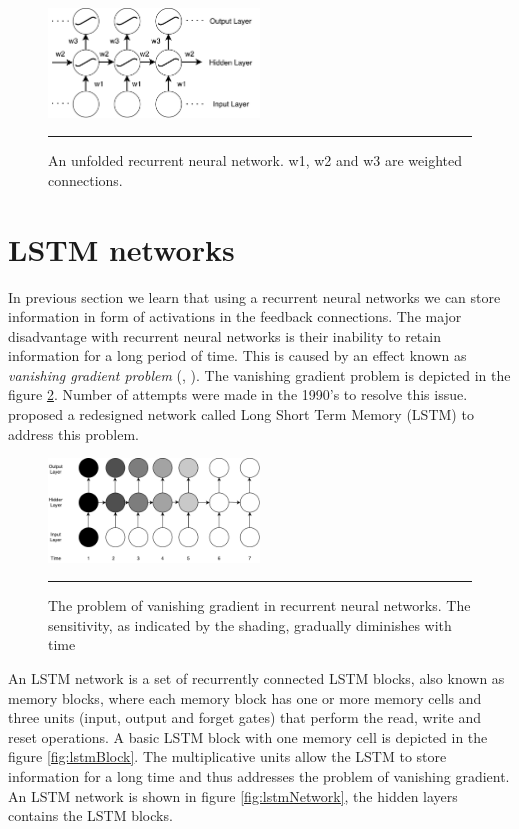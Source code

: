 \begin{figure}[htbp]
  \centering
    \includegraphics[width=0.5\textwidth,height=0.5\textheight,keepaspectratio]
    {Figures/unfolded-rnn.pdf}
    \rule{35em}{0.5pt}
  \caption[An unfolded RNN] {An unfolded recurrent neural network. w1, w2 and w3 are weighted
  connections. }
  \label{fig:unfoldedRNN}
\end{figure}

\section{LSTM networks}
In previous section we learn that using a recurrent neural networks we can store information in
form of activations in the feedback connections. The major disadvantage with recurrent neural
networks is their inability to retain information for a long period of time. This is caused by an
effect known as \emph{vanishing gradient problem} (\citet{bengio1994learning},
\citet{hochreiter2001gradient}). The vanishing gradient problem is depicted in the figure
\ref{fig:vanishingGradient}. Number of attempts were made in the 1990's to resolve this issue.
\citet{hochreiter1997long} proposed a redesigned network called Long Short Term Memory (LSTM) to
address this problem.

\begin{figure}[htbp]
  \centering
    \includegraphics[width=0.5\textwidth,height=0.5\textheight,keepaspectratio]{Figures/vanishing-gradient.pdf}
    \rule{35em}{0.5pt}
  \caption[Vanishing Gradient] {The problem of vanishing gradient in recurrent neural networks.
  The sensitivity, as indicated by the shading, gradually diminishes with time}
  \label{fig:vanishingGradient}
\end{figure}


An LSTM network is a set of recurrently connected LSTM blocks, also known as memory blocks, where
each memory block has one or more memory cells and three units (input, output and forget gates)
that perform the read, write and reset operations. A basic LSTM block with one memory cell is
depicted in the figure \ref{fig:lstmBlock}. The multiplicative units allow the LSTM to store
information for a long time and thus addresses the problem of vanishing gradient. An LSTM network
is shown in figure \ref{fig:lstmNetwork}, the hidden layers contains the LSTM blocks.

